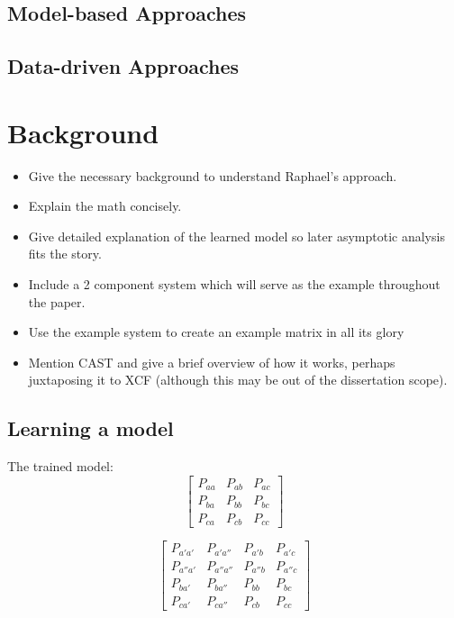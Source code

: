 \documentclass[11pt, a4paper]{report}
\begin{document}
\section{Model-based Approaches}
\section{Data-driven Approaches}

\chapter{Background}\label{cha:background}

\begin{itemize}
\item Give the necessary background to understand Raphael's approach.
\item Explain the math concisely.
\item Give detailed explanation of the learned model so later
  asymptotic analysis fits the story.
\item Include a 2 component system which will serve as the example
  throughout the paper.
\item Use the example system to create an example matrix in all its
  glory
\item Mention CAST and give a brief overview of how it works, perhaps
  juxtaposing it to XCF (although this may be out of the dissertation
  scope).
\end{itemize}

\section{Learning a model}


The trained model:
\[
\begin{bmatrix}
  P_{aa} & P_{ab} & P_{ac}\\
  P_{ba} & P_{bb} & P_{bc}\\
  P_{ca} & P_{cb} & P_{cc}
\end{bmatrix}
\]

\[
\begin{bmatrix}
  P_{a'a'}  & P_{a'a''}  & P_{a'b}  & P_{a'c}\\
  P_{a''a'} & P_{a''a''} & P_{a''b} & P_{a''c}\\
  P_{ba'}   & P_{ba''}   & P_{bb}   & P_{bc}\\
  P_{ca'}   & P_{ca''}   & P_{cb}   &  P_{cc}
\end{bmatrix}
\]
\end{document}
